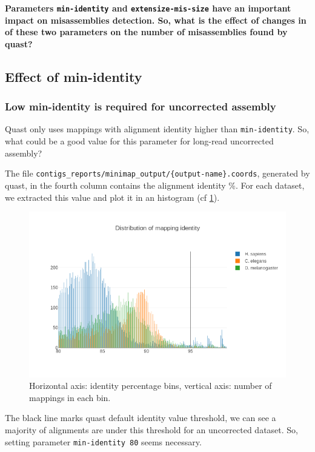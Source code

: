 \documentclass[./main.tex]{subfiles}
\begin{document}
\textbf{Parameters \texttt{min-identity} and \texttt{extensize-mis-size}
have an important impact on misassemblies detection. So, what is the
effect of changes in of these two parameters on the number of
misassemblies found by quast?}

\subsection{Effect of min-identity}

\subsubsection{Low min-identity is required for uncorrected assembly}

Quast only uses mappings with alignment identity higher than
\texttt{min-identity}. So, what could be a good value for this parameter
for long-read uncorrected assembly?

The file
\texttt{contigs\_reports/minimap\_output/\{output-name\}.coords},
generated by quast, in the fourth column contains the alignment identity
\%. For each dataset, we extracted this value and plot it in an
histogram (cf \ref{mapping_identity}).

\begin{figure}[ht]
    \centering
    \includegraphics[width=\textwidth]{paper/misassemblies-in-noisy-assemblies/misassemblies_mapping_identity_distribution.png}
    \caption{Horizontal axis: identity percentage bins, vertical axis: number of mappings in each bin.}
    \label{mapping_identity}
\end{figure}

The black line marks quast default identity value threshold, we can see
a majority of alignments are under this threshold for an uncorrected
dataset. So, setting parameter \texttt{min-identity\ 80} seems
necessary.
\end{document}
